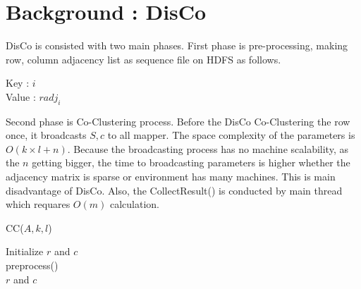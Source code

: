 \documentclass[10pt]{article}
\begin{document}
	\section{Background : DisCo}
	DisCo is consisted with two main phases. First phase is pre-processing, making row, column adjacency list as sequence file on HDFS as follows.
	\begin{center}
		Key : $i$ \\Value : $radj_i$
	\end{center} 
	Second phase is Co-Clustering process. Before the DisCo Co-Clustering the row once, it broadcasts $S,c$ to all mapper. The space complexity of the parameters is $O(k \times l + n)$. Because the broadcasting process has no machine scalability, as the $n$ getting bigger, the time to broadcasting parameters is higher whether the adjacency matrix is sparse or environment has many machines. This is main disadvantage of DisCo. Also, the CollectResult() is conducted by main thread which requares $O(m)$ calculation.\\
	\begin{algorithm}[H]            
		\DontPrintSemicolon
		\label{cc-disco}
		\caption{CC($A, k, l$)}
		Initialize $r$ and $c$\\
		preprocess()\\
		\Return $r$ and $c$
		
	\end{algorithm}
	
\end{document}
